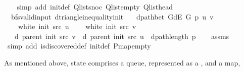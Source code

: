 \begin{isabellebody}
\ \ \isamarkupfalse%
\ {\isacharparenleft}{\kern0pt}simp\ add{\isacharcolon}{\kern0pt}\ init{\isacharunderscore}{\kern0pt}def\ Q{\isachardot}{\kern0pt}list{\isacharunderscore}{\kern0pt}snoc\ Q{\isachardot}{\kern0pt}list{\isacharunderscore}{\kern0pt}empty\ Q{\isachardot}{\kern0pt}list{\isacharunderscore}{\kern0pt}head{\isacharparenright}{\kern0pt}%
\endisatagproof
{\isafoldproof}%
%
\isadelimproof
\isanewline
%
\endisadelimproof
%
\isadeliminvisible
\isanewline
%
\endisadeliminvisible
%
\isataginvisible
{}\isamarkupfalse%
\ {\isacharparenleft}{\kern0pt}\ bfs{\isacharunderscore}{\kern0pt}valid{\isacharunderscore}{\kern0pt}input{\isacharparenright}{\kern0pt}\ d{\isacharunderscore}{\kern0pt}triangle{\isacharunderscore}{\kern0pt}inequality{\isacharunderscore}{\kern0pt}init{\isacharcolon}{\kern0pt}\isanewline
\ \ \ {\isachardoublequoteopen}dpath{\isacharunderscore}{\kern0pt}bet\ {\isacharparenleft}{\kern0pt}G{\isachardot}{\kern0pt}dE\ G{\isacharparenright}{\kern0pt}\ p\ u\ v{\isachardoublequoteclose}\isanewline
\ \ \ {\isachardoublequoteopen}{\isasymnot}\ white\ {\isacharparenleft}{\kern0pt}init\ src{\isacharparenright}{\kern0pt}\ u{\isachardoublequoteclose}\isanewline
\ \ \ {\isachardoublequoteopen}{\isasymnot}\ white\ {\isacharparenleft}{\kern0pt}init\ src{\isacharparenright}{\kern0pt}\ v{\isachardoublequoteclose}\isanewline
\ \ \ {\isachardoublequoteopen}d\ {\isacharparenleft}{\kern0pt}parent\ {\isacharparenleft}{\kern0pt}init\ src{\isacharparenright}{\kern0pt}{\isacharparenright}{\kern0pt}\ v\ {\isasymle}\ d\ {\isacharparenleft}{\kern0pt}parent\ {\isacharparenleft}{\kern0pt}init\ src{\isacharparenright}{\kern0pt}{\isacharparenright}{\kern0pt}\ u\ {\isacharplus}{\kern0pt}\ dpath{\isacharunderscore}{\kern0pt}length\ p{\isachardoublequoteclose}%
\endisataginvisible
{\isafoldinvisible}%
%
\isadeliminvisible
\isanewline
%
\endisadeliminvisible
%
\isadelimproof
\ \ %
\endisadelimproof
%
\isatagproof
{}\isamarkupfalse%
\ assms\isanewline
\ \ \isamarkupfalse%
\ {\isacharparenleft}{\kern0pt}simp\ add{\isacharcolon}{\kern0pt}\ is{\isacharunderscore}{\kern0pt}discovered{\isacharunderscore}{\kern0pt}def\ init{\isacharunderscore}{\kern0pt}def\ P{\isachardot}{\kern0pt}map{\isacharunderscore}{\kern0pt}empty{\isacharparenright}{\kern0pt}%
\endisatagproof
{\isafoldproof}%
%
\isadelimproof
%
\endisadelimproof
%
\begin{isamarkuptext}%
As mentioned above, state  comprises a queue, represented as a , and a map,

\end{isamarkuptext}
\end{isabellebody}

